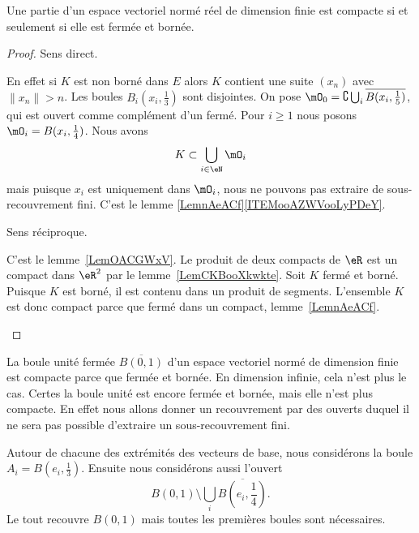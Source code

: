 \begin{theorem} \label{ThoXTEooxFmdI}
	Une partie d'un espace vectoriel normé réel de dimension finie est compacte si et seulement si elle est fermée et bornée.
\end{theorem}

\begin{proof}
	Sens direct.
	\begin{subproof}
		En effet si \( K\) est non borné dans \( E\) alors \( K\) contient une suite \( (x_n)\) avec \( \| x_n \|>n\). Les boules \( B_i(x_i,\frac{ 1 }{3})\) sont disjointes. On pose \( \mO_0=\complement\bigcup_i\overline{ B(x_i,\frac{1}{ 5 }) }\), qui est ouvert comme complément d'un fermé. Pour \( i\geq 1\) nous posons \( \mO_i=B(x_i,\frac{1}{ 4 })\). Nous avons
		\begin{equation}
			K\subset\bigcup_{i\in \eN}\mO_i
		\end{equation}
		mais puisque \( x_i\) est uniquement dans \( \mO_i\), nous ne pouvons pas extraire de sous-recouvrement fini.
		C'est le lemme \ref{LemnAeACf}\ref{ITEMooAZWVooLyPDeY}.
	\end{subproof}
	Sens réciproque.
	\begin{subproof}
		C'est le lemme~\ref{LemOACGWxV}.
		Le produit de deux compacts de \( \eR\) est un compact dans \( \eR^2\) par le lemme~\ref{LemCKBooXkwkte}.
		Soit \( K\) fermé et borné. Puisque \( K\) est borné, il est contenu dans un produit de segments. L'ensemble \( K\) est donc compact parce que fermé dans un compact, lemme~\ref{LemnAeACf}.
	\end{subproof}
\end{proof}

\begin{example}
	La boule unité fermée \( \overline{ B(0,1) }\) d'un espace vectoriel normé de dimension finie est compacte parce que fermée et bornée. En dimension infinie, cela n'est plus le cas. Certes la boule unité est encore fermée et bornée, mais elle n'est plus compacte. En effet nous allons donner un recouvrement par des ouverts duquel il ne sera pas possible d'extraire un sous-recouvrement fini.

	Autour de chacune des extrémités des vecteurs de base, nous considérons la boule \( A_i=B(e_i,\frac{1}{ 3 })\). Ensuite nous considérons aussi l'ouvert
	\begin{equation}
		B(0,1)\setminus\bigcup_i\overline{ B(e_i,\frac{1}{ 4 })}.
	\end{equation}
	Le tout recouvre \( B(0,1)\) mais toutes les premières boules sont nécessaires.
\end{example}

